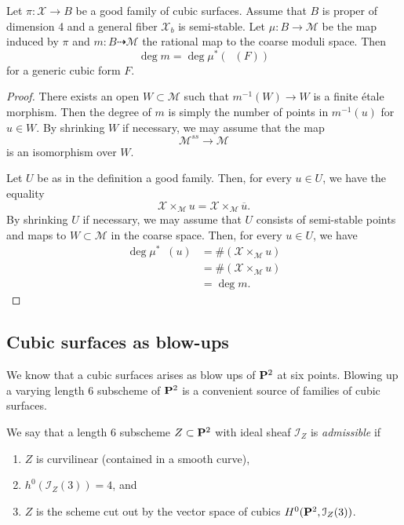 \documentclass[12pt,reqno]{amsart}
\DeclareMathOperator{\Orb}{\overline{Orb}}
\renewcommand{\to}{{\longrightarrow}}
\numberwithin{equation}{section}
\newcommand{\cX}{\mathcal{X}}
\begin{document}
\begin{proposition}\label{prop:goodisgood}
  Let $\pi \colon \cX \to B$ be a good family of cubic surfaces.
  Assume that $B$ is proper of dimension 4 and a general fiber $\cX_b$ is semi-stable.
  Let $\mu \colon B \to \mathscr M$ be the map induced by $\pi$ and $m \colon B \dashrightarrow \mathcal M$ the rational map to the coarse moduli space.
  Then
  \[ \deg m = \deg \mu^*\left( \Orb(F) \right)\]
  for a generic cubic form $F$.
\end{proposition}
\begin{proof}
  There exists an open $W \subset \mathcal M$ such that $m^{-1} (W) \to W$ is a finite \'etale morphism.
  Then the degree of $m$ is simply the number of points in $m^{-1}(u)$ for $u \in W$.
  By shrinking $W$ if necessary, we may assume that the map
  \[ \mathscr M^{ss} \to \mathcal M\]
  is an isomorphism over $W$.

  Let $U$ be as in the definition a good family.
  Then, for every $u \in U$, we have the equality
  \[ \cX \times_{\mathscr M} u = \cX \times_{\mathscr M} \overline u.\]
  By shrinking $U$ if necessary, we may assume that $U$ consists of semi-stable points and maps to $W \subset \mathcal M$ in the coarse space.
  Then, for every $u \in U$, we have
  \begin{align*}
    \deg \mu^* \Orb(u) &= \# \left(\cX \times_{\mathscr M} u \right)\\
                       &= \# \left(\cX \times_{\mathcal M} u\right) \\
                       &= \deg m.
  \end{align*}
\end{proof}

\subsection{Cubic surfaces as blow-ups}
We know that a cubic surfaces arises as blow ups of $\P^2$ at six points.
Blowing up a varying length 6 subscheme of $\P^2$ is a convenient source of families of cubic surfaces.

\begin{definition}
  We say that \label{def:admissible} a length $6$ subscheme $Z \subset \P^{2}$
  with ideal sheaf $\mathcal{I}_{Z}$ is \emph{admissible} if
  \begin{enumerate}
  \item $Z$ is curvilinear (contained in a smooth curve),
  \item $h^{0}(\mathcal{I}_Z(3)) = 4$, and
  \item $Z$ is the scheme cut out by the vector space of cubics
    $H^0(\P^2, \mathcal{I}_Z(3))$.
  \end{enumerate}
\end{definition}
\end{document}
